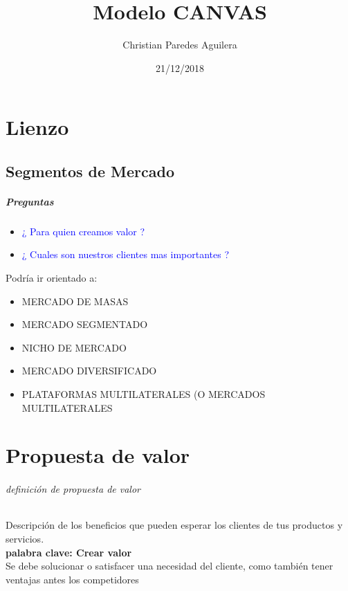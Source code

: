 \documentclass[11pt]{book}
\begin{document}
\author{Christian Paredes Aguilera}
\title{Modelo CANVAS}
\date{21/12/2018}
\maketitle
\let\cleardoublepage\clearpage
\part{Lienzo}
\let\cleardoublepage\clearpage
\chapter{Segmentos de Mercado}
\let\cleardoublepage\clearpage
\subsubsection{Preguntas}
\begin{itemize}
\item\textcolor{blue}{¿ Para quien creamos valor ?}
\item\textcolor{blue}{¿ Cuales son nuestros clientes mas importantes ?}
\end{itemize}
\vspace{0.5cm}
Podría ir orientado a:\\
\begin{itemize}
\item MERCADO DE MASAS\\
\item MERCADO SEGMENTADO\\ 

\item NICHO DE MERCADO\\
\item MERCADO DIVERSIFICADO\\
\item PLATAFORMAS MULTILATERALES (O MERCADOS MULTILATERALES
\end{itemize}
  
\part{Propuesta de valor}
\paragraph{definición de propuesta de valor}
Descripción de los beneficios que pueden esperar los clientes de tus productos y servicios.\\
\textbf{palabra clave: Crear valor}\\ 
Se debe solucionar o satisfacer una necesidad del cliente, como también tener ventajas antes los competidores
\end{document}
